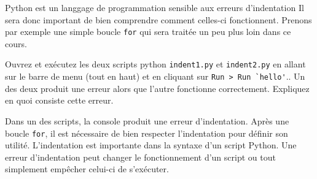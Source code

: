 Python est un langgage de programmation sensible aux erreurs d'indentation Il sera donc important de bien comprendre comment celles-ci fonctionnent. Prenons par exemple une simple boucle \lstinline{for} qui sera traitée un peu plus loin dans ce cours.
\\
\begin{Exercice}[5 minutes]

Ouvrez et exécutez les deux scripts python \lstinline{indent1.py} et \lstinline{indent2.py} en allant sur le barre de menu (tout en haut) et en cliquant sur \lstinline{Run > Run `hello'}.. Un des deux produit une erreur alors que l'autre fonctionne correctement. Expliquez en quoi consiste cette erreur.

\begin{solution}

Dans un des scripts, la console produit une erreur d'indentation. Après une boucle \lstinline{for}, il est nécessaire de bien respecter l'indentation pour définir son utilité. L'indentation est importante dans la syntaxe d'un script Python. Une erreur d'indentation peut changer le fonctionnement d'un script ou tout simplement empêcher celui-ci de s'exécuter.




\end{solution}
\end{Exercice}
